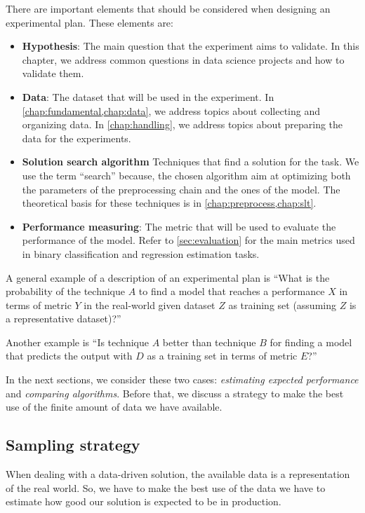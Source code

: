 There are important elements that should be considered when designing an experimental
plan.  These elements are:
\begin{itemize}
  \item \textbf{Hypothesis}: The main question that the experiment aims to validate.
    In this chapter, we address common questions in data science projects and how to
    validate them.
  \item \textbf{Data}: The dataset that will be used in the experiment.  In
    \cref{chap:fundamental,chap:data}, we address topics about collecting and organizing data.
    In \cref{chap:handling}, we address topics about preparing the data for the
    experiments.
  \item \textbf{Solution search algorithm} Techniques that find a solution for the task.
    We use the term ``search'' because, the chosen algorithm aim at optimizing both the
    parameters of the preprocessing chain and the ones of the model.  The theoretical
    basis for these techniques is in \cref{chap:preprocess,chap:slt}.
  \item \textbf{Performance measuring}: The metric that will be used to evaluate the
    performance of the model.  Refer to \cref{sec:evaluation} for the main metrics used in
    binary classification and regression estimation tasks.
\end{itemize}

A general example of a description of an experimental plan is ``What is the probability of
the technique $A$ to find a model that reaches a performance $X$ in terms of metric $Y$ in
the real-world given dataset $Z$ as training set (assuming $Z$ is a representative
dataset)?''

Another example is ``Is technique $A$ better than technique $B$ for finding a model that
predicts the output with $D$ as a training set in terms of metric $E$?''

In the next sections, we consider these two cases: \emph{estimating expected performance}
and \emph{comparing algorithms}.  Before that, we discuss a strategy to make the best use
of the finite amount of data we have available.

\subsection{Sampling strategy}

When dealing with a data-driven solution, the available data is a representation of the
real world.  So, we have to make the best use of the data we have to estimate how good our
solution is expected to be in production.

